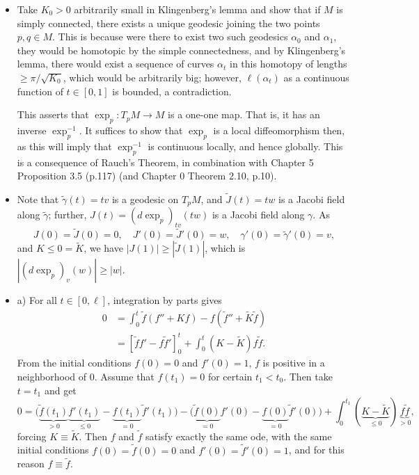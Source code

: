 \begin{itemize}
    \item[2.] Take $K_0>0$ arbitrarily small in Klingenberg's lemma 
    and show that if $M$ is simply connected, 
    there exists a unique geodesic joining the two points $p,q\in M$. 
    This is because were there to exist two such geodesics $\alpha_0$ 
    and $\alpha_1$, they would be homotopic by the simple connectedness, 
    and by Klingenberg's lemma, there would exist a sequence of curves 
    $\alpha_t$ in this homotopy of lengths $\ge\pi/\sqrt{K_0}$, 
    which would be arbitrarily big; however, $\ell(\alpha_t)$ 
    as a continuous function of $t\in[0,1]$ is bounded, a contradiction.

    This asserts that $\exp_p\colon T_pM\to M$ is a one-one map. 
    That is, it has an inverse $\exp_p^{-1}$. 
    It suffices to show that $\exp_p$ is a local diffeomorphism then, 
    as this will imply that $\exp_p^{-1}$ is continuous locally, 
    and hence globally. This is a consequence of Rauch's Theorem, 
    in combination with Chapter 5 Proposition 3.5 (p.117) 
    (and Chapter 0 Theorem 2.10, p.10).

    \item[3.] Note that $\tilde{\gamma}(t)=tv$ is a geodesic on $T_pM$, 
    and $\tilde{J}(t)=tw$ is a Jacobi field along $\tilde{\gamma}$; 
    further, $J(t)=(d\exp_p)_{tv}(tw)$ is a Jacobi field along $\gamma$. As
    \[J(0)=\tilde{J}(0)=0,\quad J'(0)=\tilde{J}'(0)=w,
    \quad \gamma'(0)=\tilde{\gamma}'(0)=v,\]
    and $K\le0=\tilde{K}$, we have $|J(1)|\ge|\tilde{J}(1)|$, 
    which is $|(d\exp_p)_v(w)|\ge|w|$.

    \item[5.] a) For all $t\in[0,\ell]$, integration by parts gives
    \begin{align*}
        0&=\int_0^t\tilde{f}(f''+Kf)-f(\tilde{f}''+\tilde{K}\tilde{f})\\
        &=[\tilde{f}f'-f\tilde{f}']_0^t+\int_0^t(K-\tilde{K})f\tilde{f}.
    \end{align*}
    From the initial conditions $f(0)=0$ and $f'(0)=1$, 
    $f$ is positive in a neighborhood of $0$. Assume that $f(t_1)=0$ 
    for certain $t_1<t_0$. Then take $t=t_1$ and get
    \[0=\big(\underbrace{\tilde{f}(t_1)}_{>0}\underbrace{f'(t_1)}_{\le0}
    -\underbrace{f(t_1)}_{=0}{\tilde{f}'(t_1)}\big)
    -\big(\underbrace{\tilde{f}(0)}_{=0}f'(0)
    -\underbrace{f(0)}_{=0}\tilde{f}'(0)\big)
    +\int_0^{t_1}(\underbrace{K-\tilde{K}}_{\le0})\underbrace{f\tilde{f}}_{>0},\]
    forcing $K\equiv\tilde{K}$. 
    Then $f$ and $\tilde{f}$ satisfy exactly the same ode, 
    with the same initial conditions 
    $f(0)=\tilde{f}(0)=0$ and $f'(0)=\tilde{f}'(0)=1$, 
    and for this reason $f\equiv\tilde{f}$.


\end{itemize}
